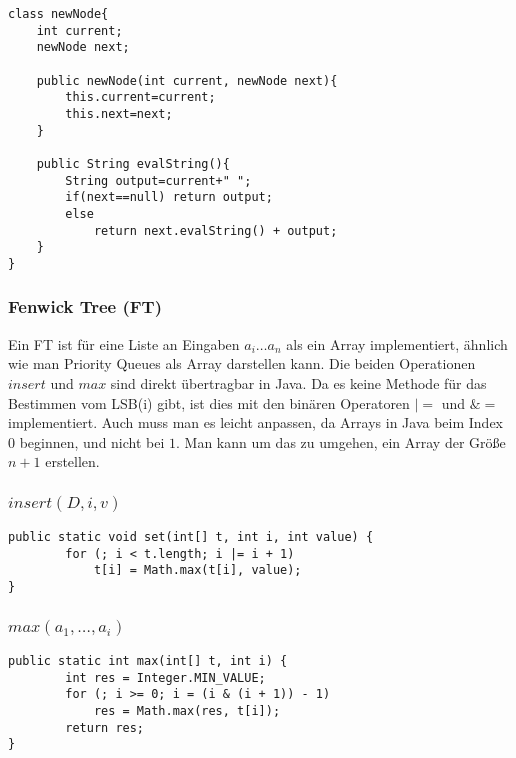 \begin{lstlisting}[mathescape]
class newNode{
    int current;
    newNode next;

    public newNode(int current, newNode next){
        this.current=current;
        this.next=next;
    }

    public String evalString(){
        String output=current+" ";
        if(next==null) return output;
        else
            return next.evalString() + output;
    }
}
\end{lstlisting}

\subsubsection{Fenwick Tree (FT) \cite{fenwick}}
Ein FT ist für eine Liste an Eingaben $a_i \dots a_n$ als ein Array implementiert, ähnlich wie man Priority Queues als Array darstellen kann. Die beiden Operationen $insert$ und $max$ sind direkt übertragbar in Java. Da es keine Methode für das Bestimmen vom LSB(i) gibt, ist dies mit den binären Operatoren $|=$ und $\&=$ implementiert. Auch muss man es leicht anpassen, da Arrays in Java beim Index 0 beginnen, und nicht bei $1$. Man kann um das zu umgehen, ein Array der Größe $n+1$ erstellen.
\subsubsection*{$insert(D,i,v)$}
\begin{lstlisting}
public static void set(int[] t, int i, int value) {
        for (; i < t.length; i |= i + 1)
            t[i] = Math.max(t[i], value);
}
\end{lstlisting}

\subsubsection*{$max(a_1,\dots,a_i)$}
\begin{lstlisting}
public static int max(int[] t, int i) {
        int res = Integer.MIN_VALUE;
        for (; i >= 0; i = (i & (i + 1)) - 1)
            res = Math.max(res, t[i]);
        return res;
}
\end{lstlisting}

\newpage


